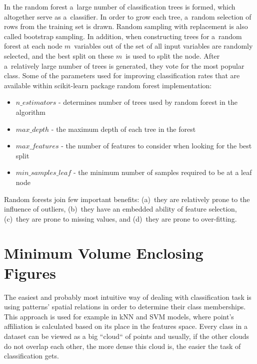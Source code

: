 In the random forest a~large number of classification trees is formed, which altogether serve as a~classifier. In order to grow each tree, a~random selection of rows from the training set is drawn. Random sampling with replacement is also called bootstrap sampling. In addition, when constructing trees for a~random forest at each node $m$~variables out of the set of all input variables are randomly selected, and the best split on these $m$~is used to split the node. After a~relatively large number of trees is generated, they vote for the most popular class. Some of the parameters used for improving classification rates that are available within scikit-learn package random forest implementation:

\begin{itemize}
	\item $n\_estimators$ - determines number of trees used by random forest in the algorithm
	\item $max\_depth$ - the maximum depth of each tree in the forest
	\item $max\_features$ - the number of features to consider when looking for the best split
	\item $min\_samples\_leaf$ - the minimum number of samples required to be at a leaf node
\end{itemize}

Random forests join few important benefits: (a)~they are relatively prone to the influence of outliers, (b)~they have an embedded ability of feature selection, (c)~they are prone to missing values, and (d)~they are prone to over-fitting.

\section{Minimum Volume Enclosing Figures}

The easiest and probably most intuitive way of dealing with classification task is using patterns' spatial relations in order to determine their class memberships. This approach is used for example in kNN and SVM models, where point's affiliation is calculated based on its place in the features space. Every class in a dataset can be viewed as a big ``cloud`` of points and usually, if the other clouds do not overlap each other, the more dense this cloud is, the easier the task of classification gets.

